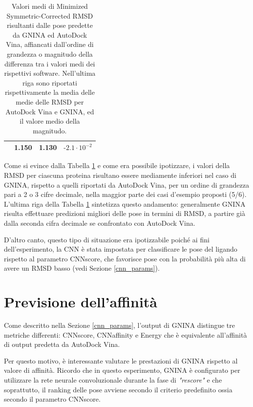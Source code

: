 \begin{table}[H]
{\begin{tabular}{|c|c|c|c|}
\multicolumn{1}{|l|}{} & 1.150                                                                         & 1.130                                                                 & \(\textbf{-}2.1 \cdot 10^{-2}\) \\ \hline
\end{tabular}%
}
\caption[Valori medi di RMSD* e magnitudo della differenza risultanti dalle pose predette da GNINA ed AutoDock Vina.]
{\small Valori medi di Minimized Symmetric-Corrected RMSD risultanti dalle pose predette da GNINA ed AutoDock Vina, affiancati dall'ordine di grandezza o magnitudo della differenza tra i valori medi dei rispettivi software. Nell'ultima riga sono riportati rispettivamente la media delle medie delle RMSD per AutoDock Vina e GNINA, ed il valore medio della magnitudo.}
\label{rmsd_table}
\end{table}

Come si evince dalla Tabella \ref{rmsd_table} e come era possibile ipotizzare, i valori della RMSD per ciascuna proteina risultano essere mediamente inferiori nel caso di GNINA, rispetto a quelli riportati da AutoDock Vina, per un ordine di grandezza pari a 2 o 3 cifre decimale, nella maggior parte dei casi d'esempio proposti (5/6).
L'ultima riga della Tabella \ref{rmsd_table} sintetizza questo andamento: generalmente GNINA risulta effettuare predizioni migliori delle pose in termini di RMSD, a partire già dalla seconda cifra decimale se confrontato con AutoDock Vina.

D'altro canto, questo tipo di situazione era ipotizzabile poiché ai fini dell'esperimento, la CNN è stata impostata per classificare le pose del ligando rispetto al parametro CNNscore, che favorisce pose con la probabilità più alta di avere un RMSD basso (vedi Sezione \ref{cnn_params}).

\section{Previsione dell'affinità}
Come descritto nella Sezione \ref{cnn_params}, l'output di GNINA distingue tre metriche differenti: CNNscore, CNNaffinity e Energy che è equivalente all'affinità di output predetta da AutoDock Vina.

Per questo motivo, è interessante valutare le prestazioni di GNINA rispetto al valore di affinità.
Ricordo che in questo esperimento, GNINA è configurato per utilizzare la rete neurale convoluzionale durante la fase di \textit{"rescore"} e che soprattutto, il ranking delle pose avviene secondo il criterio predefinito ossia secondo il parametro CNNscore.

